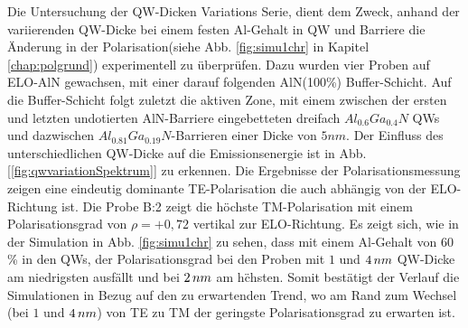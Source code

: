 \noindent
Die Untersuchung der QW-Dicken Variations Serie, dient dem Zweck, anhand der variierenden QW-Dicke bei einem festen Al-Gehalt in QW und Barriere die Änderung in der Polarisation(siehe Abb. \ref{fig:simu1chr} in Kapitel \ref{chap:polgrund}) experimentell zu \"uberpr\"ufen. Dazu wurden vier Proben auf ELO-AlN gewachsen, mit einer darauf folgenden AlN(100\%) Buffer-Schicht. Auf die Buffer-Schicht folgt zuletzt die aktiven Zone, mit einem zwischen der ersten und letzten undotierten AlN-Barriere eingebetteten dreifach $Al_{0.6}Ga_{0.4}N$ QWs und dazwischen $Al_{0.81}Ga_{0.19}N$-Barrieren einer Dicke von $5nm$. 
Der Einfluss des unterschiedlichen QW-Dicke auf die Emissionsenergie ist in Abb. [\ref{fig:qwvariationSpektrum}] zu erkennen.
\newline
Die Ergebnisse der Polarisationsmessung zeigen eine eindeutig dominante TE-Polarisation die auch abh\"angig von der ELO-Richtung ist. Die Probe B:2 zeigt die h\"ochste TM-Polarisation mit einem Polarisationsgrad von $\rho=+0,72$ vertikal zur ELO-Richtung. 
\newline Es zeigt sich, wie in der Simulation
in Abb. \ref{fig:simu1chr} zu sehen, dass mit einem Al-Gehalt von $60$\% in den QWs, der Polarisationsgrad bei den Proben mit $1$ und $4 \thinspace nm$ QW-Dicke am niedrigsten ausf\"allt und bei $2 \thinspace nm$ am h\"chsten. Somit best\"atigt der Verlauf die Simulationen in Bezug auf den zu erwartenden Trend, wo am Rand zum Wechsel (bei $1$ und $4 \thinspace nm$) von TE zu TM der geringste Polarisationsgrad zu erwarten ist.
